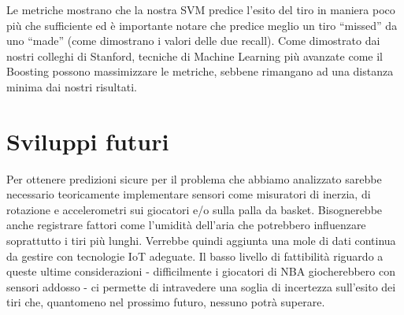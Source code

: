 Le metriche mostrano che la nostra SVM predice l'esito del tiro in maniera poco più che sufficiente ed è importante notare che predice meglio un tiro “missed” da uno “made” (come dimostrano i valori delle due recall).
Come dimostrato dai nostri colleghi di Stanford, tecniche di Machine Learning più avanzate come il Boosting possono massimizzare le metriche, sebbene rimangano ad una distanza minima dai nostri risultati.
\section{Sviluppi futuri}
Per ottenere predizioni sicure per il problema che abbiamo analizzato sarebbe necessario teoricamente implementare sensori come misuratori di inerzia, di rotazione e accelerometri sui giocatori e/o sulla palla da basket. Bisognerebbe anche registrare fattori come l'umidità dell'aria che potrebbero influenzare soprattutto i tiri più lunghi. Verrebbe quindi aggiunta una mole di dati continua da gestire con tecnologie IoT adeguate. Il basso livello di fattibilità riguardo a queste ultime considerazioni - difficilmente i giocatori di NBA giocherebbero con sensori addosso - ci permette di intravedere una soglia di incertezza sull'esito dei tiri che, quantomeno nel prossimo futuro, nessuno potrà superare.


